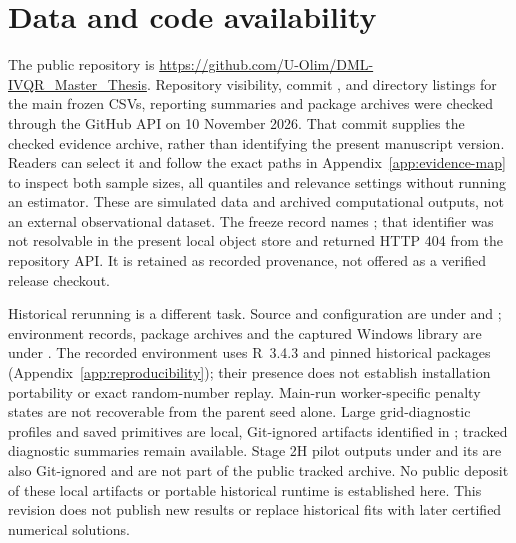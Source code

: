 \section*{Data and code availability}
The public repository is \url{https://github.com/U-Olim/DML-IVQR_Master_Thesis}. Repository visibility, commit , and directory listings for the main frozen CSVs, reporting summaries and package archives were checked through the GitHub API on 10 November 2026. That commit supplies the checked evidence archive, rather than identifying the present manuscript version. Readers can select it and follow the exact paths in Appendix~\ref{app:evidence-map} to inspect both sample sizes, all quantiles and relevance settings without running an estimator. These are simulated data and archived computational outputs, not an external observational dataset. The freeze record names ; that identifier was not resolvable in the present local object store and returned HTTP 404 from the repository API. It is retained as recorded provenance, not offered as a verified release checkout.

Historical rerunning is a different task. Source and configuration are under  and ; environment records, package archives and the captured Windows library are under . The recorded environment uses R~3.4.3 and pinned historical packages (Appendix~\ref{app:reproducibility}); their presence does not establish installation portability or exact random-number replay. Main-run worker-specific penalty states are not recoverable from the parent seed alone. Large grid-diagnostic profiles and saved primitives are local, Git-ignored artifacts identified in ; tracked diagnostic summaries remain available. Stage 2H pilot outputs under  and its  are also Git-ignored and are not part of the public tracked archive. No public deposit of these local artifacts or portable historical runtime is established here. This revision does not publish new results or replace historical fits with later certified numerical solutions.
